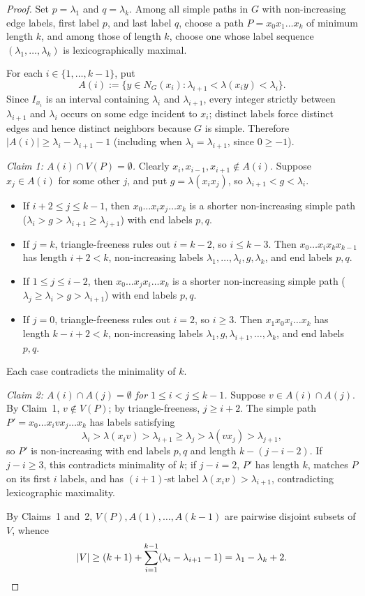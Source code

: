 \documentclass[11pt]{article}
\begin{document}
\begin{proof}
Set $p = \lambda_1$ and $q = \lambda_k$. Among all simple paths in $G$ with non-increasing edge labels, first label $p$, and last label $q$, choose a path $P = x_0 x_1 \dots x_k$ of minimum length $k$, and among those of length $k$, choose one whose label sequence $(\lambda_1, \dots, \lambda_k)$ is lexicographically maximal.

For each $i \in \{1, \dots, k - 1\}$, put
\[
A(i) := \{y \in N_G(x_i) : \lambda_{i+1} < \lambda(x_i y) < \lambda_i\}.
\]
Since $I_{x_i}$ is an interval containing $\lambda_i$ and $\lambda_{i+1}$, every integer strictly between $\lambda_{i+1}$ and $\lambda_i$ occurs on some edge incident to $x_i$; distinct labels force distinct edges and hence distinct neighbors because $G$ is simple. Therefore $|A(i)| \ge \lambda_i - \lambda_{i+1} - 1$ (including when $\lambda_i = \lambda_{i+1}$, since $0 \ge -1$).

\smallskip\noindent\emph{Claim 1: $A(i) \cap V(P) = \emptyset$.}
Clearly $x_i, x_{i-1}, x_{i+1} \notin A(i)$. Suppose $x_j \in A(i)$ for some other $j$, and put $g = \lambda(x_i x_j)$, so $\lambda_{i+1} < g < \lambda_i$.
\begin{itemize}
\item If $i + 2 \le j \le k - 1$, then $x_0 \dots x_i x_j \dots x_k$ is a shorter non-increasing simple path ($\lambda_i > g > \lambda_{i+1} \ge \lambda_{j+1}$) with end labels $p, q$.
\item If $j = k$, triangle-freeness rules out $i = k - 2$, so $i \le k - 3$. Then $x_0 \dots x_i x_k x_{k-1}$ has length $i + 2 < k$, non-increasing labels $\lambda_1, \dots, \lambda_i, g, \lambda_k$, and end labels $p, q$.
\item If $1 \le j \le i - 2$, then $x_0 \dots x_j x_i \dots x_k$ is a shorter non-increasing simple path ($\lambda_j \ge \lambda_i > g > \lambda_{i+1}$) with end labels $p, q$.
\item If $j = 0$, triangle-freeness rules out $i = 2$, so $i \ge 3$. Then $x_1 x_0 x_i \dots x_k$ has length $k - i + 2 < k$, non-increasing labels $\lambda_1, g, \lambda_{i+1}, \dots, \lambda_k$, and end labels $p, q$.
\end{itemize}
Each case contradicts the minimality of $k$.

\smallskip\noindent\emph{Claim 2: $A(i) \cap A(j) = \emptyset$ for $1 \le i < j \le k - 1$.}
Suppose $v \in A(i) \cap A(j)$. By Claim~1, $v \notin V(P)$; by triangle-freeness, $j \ge i + 2$. The simple path $P' = x_0 \dots x_i v x_j \dots x_k$ has labels satisfying
\[
\lambda_i > \lambda(x_i v) > \lambda_{i+1} \ge \lambda_j > \lambda(v x_j) > \lambda_{j+1},
\]
so $P'$ is non-increasing with end labels $p, q$ and length $k - (j - i - 2)$. If $j - i \ge 3$, this contradicts minimality of $k$; if $j - i = 2$, $P'$ has length $k$, matches $P$ on its first $i$ labels, and has $(i + 1)$-st label $\lambda(x_i v) > \lambda_{i+1}$, contradicting lexicographic maximality.

By Claims~1 and~2, $V(P), A(1), \dots, A(k - 1)$ are pairwise disjoint subsets of $V$, whence
\[
|V| \ge (k + 1) + \sum_{i=1}^{k-1} (\lambda_i - \lambda_{i+1} - 1) = \lambda_1 - \lambda_k + 2. \qedhere
\]
\end{proof}
\end{document}
